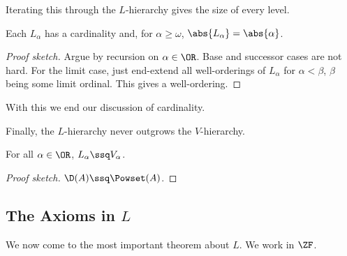 Iterating this through the $L$-hierarchy gives the size of every level.

\begin{boxcorollary} \label{Ch3:Cor:L_Alpha_Cardinality}
    Each $L_{\alpha}$ has a cardinality and, for $\alpha \geq \omega$, $\abs{L_{\alpha}} = \abs{\alpha}$.
\end{boxcorollary}
\begin{proof}[Proof sketch]
    Argue by recursion on $\alpha \in \OR$. Base and successor cases are not hard. For the limit case, just end-extend all well-orderings of $L_{\alpha}$ for $\alpha < \beta$, $\beta$ being some limit ordinal. This gives a well-ordering.
\end{proof}

With this we end our discussion of cardinality.

Finally, the $L$-hierarchy never outgrows the $V$-hierarchy.

\begin{boxlemma}
    For all $\alpha \in \OR$, $L_{\alpha} \ssq V_{\alpha}$.
\end{boxlemma}
\begin{proof}[Proof sketch]
    $\D(A) \ssq \Powset(A)$.
\end{proof}

\subsection{The Axioms in $L$}

We now come to the most important theorem about $L$. We work in $\ZF$.

